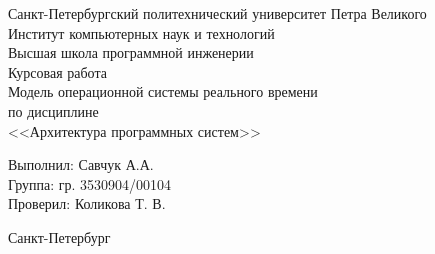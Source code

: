 \begin{titlepage}	%

	\begin{center}		%

		\large Санкт-Петербургский политехнический университет Петра Великого\\
		\large Институт компьютерных наук и технологий\\
		\large Высшая школа программной инженерии \\[6cm]

    \huge Курсовая работа \\%
		\large Модель операционной системы реального времени \\ [0.5cm]
		\large по дисциплине\\[0.1cm]
		\large <<Архитектура программных систем>>\\[5cm]

	\end{center}

		\noindent\large Выполнил: \hfill \large Савчук А.А.\\
		\noindent\large Группа: \hfill \large гр. 3530904/00104\\

		\noindent\large Проверил: \hfill \large Коликова Т. В.

	\vfill %

	\begin{center}
	\large Санкт-Петербург\\
	\large \the\year %
	\end{center} %

\end{titlepage} %

\vfill %
